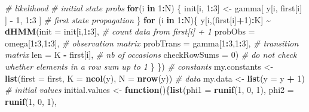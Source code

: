 \documentclass[
  12pt,
]{krantz}
\newenvironment{Shaded}{\begin{snugshade}}{\end{snugshade}}
\newcommand{\AttributeTok}[1]{\textcolor[rgb]{0.13,0.29,0.53}{#1}}
\newcommand{\CommentTok}[1]{\textcolor[rgb]{0.56,0.35,0.01}{\textit{#1}}}
\newcommand{\ControlFlowTok}[1]{\textcolor[rgb]{0.13,0.29,0.53}{\textbf{#1}}}
\newcommand{\DecValTok}[1]{\textcolor[rgb]{0.00,0.00,0.81}{#1}}
\newcommand{\FunctionTok}[1]{\textcolor[rgb]{0.13,0.29,0.53}{\textbf{#1}}}
\newcommand{\NormalTok}[1]{#1}
\newcommand{\OtherTok}[1]{\textcolor[rgb]{0.56,0.35,0.01}{#1}}
\newcommand{\SpecialCharTok}[1]{\textcolor[rgb]{0.81,0.36,0.00}{\textbf{#1}}}
\begin{document}
\begin{Shaded}
\begin{Highlighting}[]
  \CommentTok{\# likelihood }
  \CommentTok{\# initial state probs}
  \ControlFlowTok{for}\NormalTok{(i }\ControlFlowTok{in} \DecValTok{1}\SpecialCharTok{:}\NormalTok{N) \{}
\NormalTok{    init[i, }\DecValTok{1}\SpecialCharTok{:}\DecValTok{3}\NormalTok{] }\OtherTok{\textless{}{-}}\NormalTok{ gamma[ y[i, first[i] ] }\SpecialCharTok{{-}} \DecValTok{1}\NormalTok{, }\DecValTok{1}\SpecialCharTok{:}\DecValTok{3}\NormalTok{ ]        }\CommentTok{\# first state propagation}
\NormalTok{  \}}
  \ControlFlowTok{for}\NormalTok{ (i }\ControlFlowTok{in} \DecValTok{1}\SpecialCharTok{:}\NormalTok{N)\{}
\NormalTok{    y[i,(first[i]}\SpecialCharTok{+}\DecValTok{1}\NormalTok{)}\SpecialCharTok{:}\NormalTok{K] }\SpecialCharTok{\textasciitilde{}} \FunctionTok{dHMM}\NormalTok{(}\AttributeTok{init =}\NormalTok{ init[i,}\DecValTok{1}\SpecialCharTok{:}\DecValTok{3}\NormalTok{],           }\CommentTok{\# count data from first[i] + 1}
                               \AttributeTok{probObs =}\NormalTok{ omega[}\DecValTok{1}\SpecialCharTok{:}\DecValTok{3}\NormalTok{,}\DecValTok{1}\SpecialCharTok{:}\DecValTok{3}\NormalTok{],     }\CommentTok{\# observation matrix}
                               \AttributeTok{probTrans =}\NormalTok{ gamma[}\DecValTok{1}\SpecialCharTok{:}\DecValTok{3}\NormalTok{,}\DecValTok{1}\SpecialCharTok{:}\DecValTok{3}\NormalTok{],   }\CommentTok{\# transition matrix}
                               \AttributeTok{len =}\NormalTok{ K }\SpecialCharTok{{-}}\NormalTok{ first[i],           }\CommentTok{\# nb of occasions}
                               \AttributeTok{checkRowSums =} \DecValTok{0}\NormalTok{)             }\CommentTok{\# do not check whether elements in a row sum up to 1}
\NormalTok{  \}}
\NormalTok{\})}
\CommentTok{\# constants}
\NormalTok{my.constants }\OtherTok{\textless{}{-}} \FunctionTok{list}\NormalTok{(}\AttributeTok{first =}\NormalTok{ first, }
                     \AttributeTok{K =} \FunctionTok{ncol}\NormalTok{(y), }
                     \AttributeTok{N =} \FunctionTok{nrow}\NormalTok{(y))}
\CommentTok{\# data}
\NormalTok{my.data }\OtherTok{\textless{}{-}} \FunctionTok{list}\NormalTok{(}\AttributeTok{y =}\NormalTok{ y }\SpecialCharTok{+} \DecValTok{1}\NormalTok{)}
\CommentTok{\# initial values }
\NormalTok{initial.values }\OtherTok{\textless{}{-}} \ControlFlowTok{function}\NormalTok{()\{}\FunctionTok{list}\NormalTok{(}\AttributeTok{phi1 =} \FunctionTok{runif}\NormalTok{(}\DecValTok{1}\NormalTok{, }\DecValTok{0}\NormalTok{, }\DecValTok{1}\NormalTok{), }
                                  \AttributeTok{phi2 =} \FunctionTok{runif}\NormalTok{(}\DecValTok{1}\NormalTok{, }\DecValTok{0}\NormalTok{, }\DecValTok{1}\NormalTok{), }

\end{Highlighting}
\end{Shaded}
\end{document}
